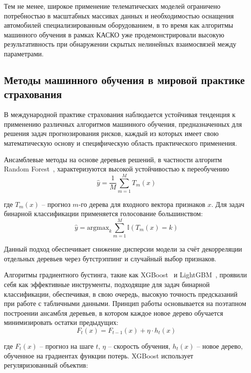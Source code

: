 Тем не менее, широкое применение телематических моделей ограничено потребностью в масштабных массивах данных и необходимостью оснащения автомобилей специализированным оборудованием, в то время как алгоритмы машинного обучения в рамках КАСКО уже продемонстрировали высокую результативность при обнаружении скрытых нелинейных взаимосвязей между параметрами.

\subsection{Методы машинного обучения в мировой практике страхования}

В международной практике страхования наблюдается устойчивая тенденция к применению различных алгоритмов машинного обучения, предназначенных для решения задач прогнозирования рисков, каждый из которых имеет свою математическую основу и специфическую область практического применения.

Ансамблевые методы на основе деревьев решений, в частности алгоритм Random Forest~\cite{kolesnikov2012intel}, характеризуются высокой устойчивостью к переобучению\begin{equation*}
\hat{y} = \frac{1}{M} \sum_{m=1}^{M} T_m(x)
\end{equation*}

где $T_m(x)$ – прогноз $m$-го дерева для входного вектора признаков $x$. Для задач бинарной классификации применяется голосование большинством:
\begin{equation*}
\hat{y} = \mathrm{argmax}_k \sum_{m=1}^{M} \mathbb{I}(T_m(x) = k)
\end{equation*}

Данный подход обеспечивает снижение дисперсии модели за счёт декорреляции отдельных деревьев через бутстрэппинг и случайный выбор признаков.

Алгоритмы градиентного бустинга, такие как XGBoost~\cite{xgboost2026docs} и LightGBM~\cite{lightgbm2026docs}, проявили себя как эффективные инструменты, подходящие для задач бинарной классификации, обеспечивая, в свою очередь, высокую точность предсказаний при работе с табличными данными. Принцип работы основывается на поэтапном построении ансамбля деревьев, в котором каждое новое дерево обучается минимизировать остатки предыдущих:
\begin{equation*}
F_t(x) = F_{t-1}(x) + \eta \cdot h_t(x)
\end{equation*}

где $F_t(x)$ – прогноз на шаге $t$, $\eta$ – скорость обучения, $h_t(x)$ – новое дерево, обученное на градиентах функции потерь. XGBoost использует регуляризованный объектив:

